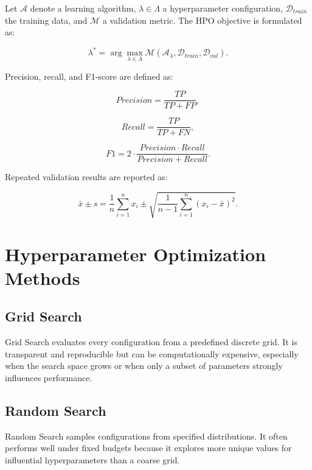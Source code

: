 \documentclass[runningheads]{llncs}
\begin{document}
Let $\mathcal{A}$ denote a learning algorithm, $\lambda \in \Lambda$ a hyperparameter configuration, $\mathcal{D}_{train}$ the training data, and $\mathcal{M}$ a validation metric. The HPO objective is formulated as:

\begin{equation}
\lambda^{*} = \arg\max_{\lambda \in \Lambda} \mathcal{M}\left(\mathcal{A}_{\lambda}, \mathcal{D}_{train}, \mathcal{D}_{val}\right).
\end{equation}

Precision, recall, and F1-score are defined as:

\begin{equation}
Precision = \frac{TP}{TP + FP},
\end{equation}

\begin{equation}
Recall = \frac{TP}{TP + FN},
\end{equation}

\begin{equation}
F1 = 2 \cdot \frac{Precision \cdot Recall}{Precision + Recall}.
\end{equation}

Repeated validation results are reported as:

\begin{equation}
\bar{x} \pm s = \frac{1}{n}\sum_{i=1}^{n}x_i \pm \sqrt{\frac{1}{n-1}\sum_{i=1}^{n}(x_i-\bar{x})^2}.
\end{equation}

\section{Hyperparameter Optimization Methods}

\subsection{Grid Search}

Grid Search evaluates every configuration from a predefined discrete grid. It is transparent and reproducible but can be computationally expensive, especially when the search space grows or when only a subset of parameters strongly influences performance.

\subsection{Random Search}

Random Search samples configurations from specified distributions. It often performs well under fixed budgets because it explores more unique values for influential hyperparameters than a coarse grid.
\end{document}
